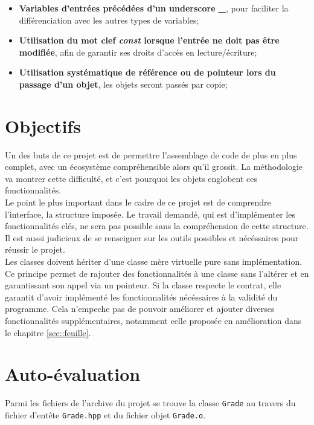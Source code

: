 \documentclass[9pts]{article}
\begin{document}
\begin{itemize}
\item \textbf{Variables d'entrées précédées d'un underscore \emph{\_}}, pour faciliter la différenciation avec les autres types de variables;
\item \textbf{Utilisation du mot clef \emph{const} lorsque l'entrée ne doit pas être modifiée}, afin de garantir ses droits d'accès en lecture/écriture;
\item \textbf{Utilisation systématique de référence ou de pointeur lors du passage d'un objet}, les objets seront passés par copie;
\end{itemize}

\pagebreak

\section{Objectifs}

Un des buts de ce projet est de permettre l'assemblage de code de plus en plus complet, avec un écosystème compréhensible alors qu'il grossit. La méthodologie va montrer cette difficulté, et
c'est pourquoi les objets englobent ces fonctionnalités. \\

Le point le plus important dans le cadre de ce projet est de comprendre l'interface, la structure imposée. Le travail demandé, qui est d'implémenter les fonctionnalités clés, ne sera pas possible sans la compréhension de cette structure. Il est aussi judicieux de se renseigner sur les outils possibles et nécéssaires pour réussir le projet.\\

Les classes doivent hériter d'une classe mère virtuelle pure sans implémentation. Ce principe permet de rajouter des fonctionnalités à une classe sans l'altérer et en garantissant son appel via un pointeur.
Si la classe respecte le contrat, elle garantit d'avoir implémenté les fonctionnalités nécéssaires à la validité du programme. Cela n'empeche pas de pouvoir améliorer et ajouter diverses fonctionnalités supplémentaires, notamment celle proposée en amélioration dans le chapitre \ref{sec::feuille}. \\

\section{Auto-évaluation}
\label{sec::autoeval}
Parmi les fichiers de l'archive du projet se trouve la classe \texttt{Grade} au travers du fichier d'entête \texttt{Grade.hpp} et du fichier objet \texttt{Grade.o}.\\
\end{document}
